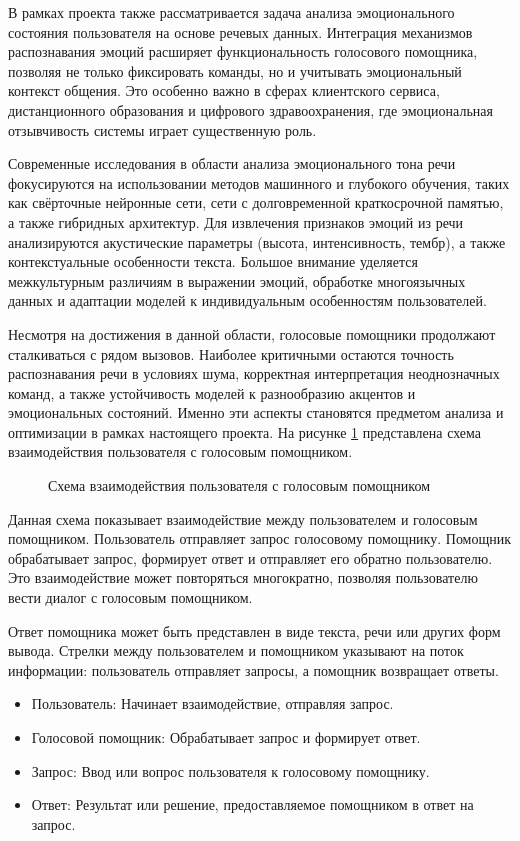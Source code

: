 В рамках проекта также рассматривается задача анализа эмоционального состояния пользователя на основе речевых данных. Интеграция механизмов распознавания эмоций расширяет функциональность голосового помощника, позволяя не только фиксировать команды, но и учитывать эмоциональный контекст общения. Это особенно важно в сферах клиентского сервиса, дистанционного образования и цифрового здравоохранения, где эмоциональная отзывчивость системы играет существенную роль.

Современные исследования в области анализа эмоционального тона речи фокусируются на использовании методов машинного и глубокого обучения, таких как свёрточные нейронные сети, сети с долговременной краткосрочной памятью, а также гибридных архитектур. Для извлечения признаков эмоций из речи анализируются акустические параметры (высота, интенсивность, тембр), а также контекстуальные особенности текста. Большое внимание уделяется межкультурным различиям в выражении эмоций, обработке многоязычных данных и адаптации моделей к индивидуальным особенностям пользователей.

Несмотря на достижения в данной области, голосовые помощники продолжают сталкиваться с рядом вызовов. Наиболее критичными остаются точность распознавания речи в условиях шума, корректная интерпретация неоднозначных команд, а также устойчивость моделей к разнообразию акцентов и эмоциональных состояний. Именно эти аспекты становятся предметом анализа и оптимизации в рамках настоящего проекта.
На рисунке \ref{fig:VoiceAssistant} представлена схема  взаимодействия пользователя с голосовым помощником.
 \begin{figure}[H]
 	\centering
 	\caption{Схема взаимодействия пользователя с голосовым помощником}
 	\label{fig:VoiceAssistant}
 \end{figure}
 
 
 Данная схема показывает взаимодействие между пользователем и голосовым помощником. Пользователь отправляет запрос голосовому помощнику. Помощник обрабатывает запрос, формирует ответ и отправляет его обратно пользователю. Это взаимодействие может повторяться многократно, позволяя пользователю вести диалог с голосовым помощником.
 
 Ответ помощника может быть представлен в виде текста, речи или других форм вывода. Стрелки между пользователем и помощником указывают на поток информации: пользователь отправляет запросы, а помощник возвращает ответы.
 
 \begin{itemize}
 	\item Пользователь: Начинает взаимодействие, отправляя запрос.
 	\item Голосовой помощник: Обрабатывает запрос и формирует ответ.
 	\item Запрос: Ввод или вопрос пользователя к голосовому помощнику.
 	\item Ответ: Результат или решение, предоставляемое помощником в ответ на запрос.
 \end{itemize}
 
